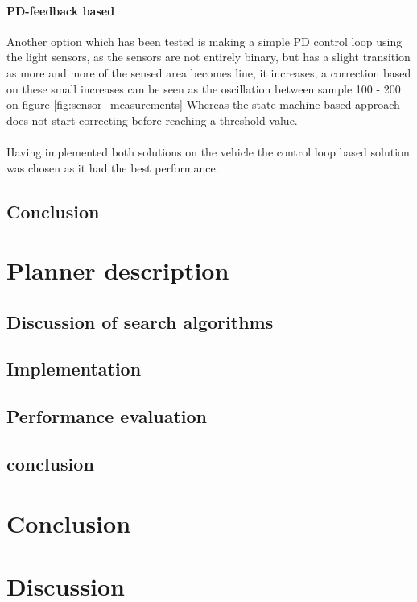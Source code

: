 \documentclass[draft, english, a4paper]{article}
\begin{document}
            \paragraph{PD-feedback based}
            Another option which has been tested is making a simple PD control loop
            using the light sensors, as the sensors are not entirely binary,
            but has a slight transition as more and more of the sensed area becomes
            line, it increases, a correction based on these small increases can 
            be seen as the oscillation between sample 100 - 200 on figure \ref{fig:sensor_measurements}
            Whereas the state machine based approach does not start correcting before reaching a threshold value.\\
            \\
            Having implemented both solutions on the vehicle the control loop based
            solution was chosen as it had the best performance.
	\subsection{Conclusion} %
\section{Planner description}
    
	\subsection{Discussion of search algorithms} %
		
	\subsection{Implementation}
	
	\subsection{Performance evaluation}
	\subsection{conclusion}
\section{Conclusion}
\section{Discussion}


\appendix
\end{document}
